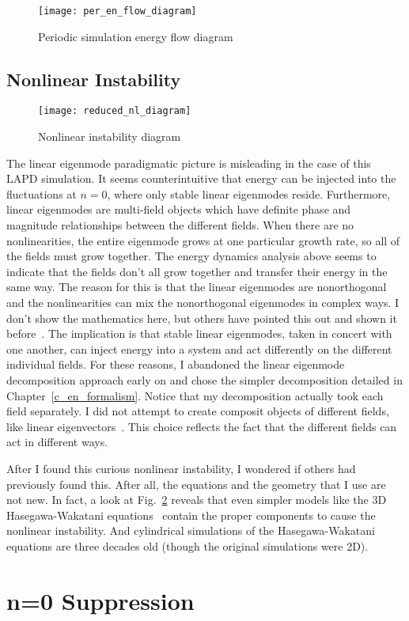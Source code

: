 \begin{figure}[!ht]
\centerline{\texttt{[image: per\_en\_flow\_diagram]}}
\caption{Periodic simulation energy flow diagram}
\label{per_en_flow_diagram}
\end{figure}


\subsection{Nonlinear Instability}
\label{ss_nl_inst}

\begin{figure}[!ht]
\centerline{\texttt{[image: reduced\_nl\_diagram]}}
\caption{Nonlinear instability diagram}
\label{reduced_nl_diagram}
\end{figure}


The linear eigenmode paradigmatic picture is misleading in the case of this LAPD simulation. It seems counterintuitive that energy can be injected into the fluctuations at $n=0$, where only
stable linear eigenmodes reside. Furthermore, linear eigenmodes are multi-field objects which have definite phase and magnitude relationships between the different fields. When there are no
nonlinearities, the entire eigenmode grows at one particular growth rate, so all of the fields must grow together. The energy dynamics analysis above seems to indicate that the fields
don't all grow together and transfer their energy in the same way. The reason for this is that the linear eigenmodes are nonorthogonal and the nonlinearities can mix the nonorthogonal eigenmodes
in complex ways. I don't show the mathematics here, but others have pointed this out and shown it before~\cite{camargo1998,kim2010}. The implication is that stable linear eigenmodes, 
taken in concert with one another, can inject energy into a system and act differently on the different individual fields.
For these reasons, I abandoned the linear eigenmode
decomposition approach early on and chose the simpler decomposition detailed in Chapter~\ref{c_en_formalism}. Notice that my decomposition actually took each field separately. I did not attempt
to create composit objects of different fields, like linear eigenvectors~\cite{baver2002,terry2002,terry2006a,terry2006b,gatto2006,terry2009,kim2010,makwana2011}. This choice reflects
the fact that the different fields can act in different ways.

After I found this curious nonlinear instability, I wondered if others had previously found this. After all, the equations and the geometry that I use are not new. In fact, a look at 
Fig.~\ref{reduced_nl_diagram} reveals that even simpler models like the 3D Hasegawa-Wakatani equations~\cite{hasegawa1983} contain the proper components to cause the nonlinear instability. And 
cylindrical simulations of the Hasegawa-Wakatani equations are three decades old (though the original simulations were 2D).

\section{n=0 Suppression}
\label{s_n0_supp}
